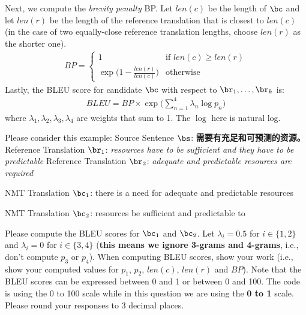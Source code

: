 \begin{parts}
    Next, we compute the \textit{brevity penalty} BP. Let $len(c)$ be the length of $\bc$ and let $len(r)$ be the length of the reference translation that is closest to $len(c)$ (in the case of two equally-close reference translation lengths, choose $len(r)$ as the shorter one). 
    \begin{align}
        BP = 
        \begin{cases}
            1 & \text{if } len(c) \ge len(r) \\
            \exp \big( 1 - \frac{len(r)}{len(c)} \big) & \text{otherwise}
        \end{cases}
    \end{align}
    Lastly, the BLEU score for candidate $\bc$ with respect to $\br_1,\dots,\br_k$ is:
    \begin{align}
        BLEU = BP \times \exp \Big( \sum_{n=1}^4 \lambda_n \log p_n \Big)
    \end{align}
    where $\lambda_1,\lambda_2,\lambda_3,\lambda_4$ are weights that sum to 1. The $\log$ here is natural log.
    \newline
    \begin{subparts}
        \subpart[5] Please consider this example: \newline
        Source Sentence $\bs$: \textbf{需要有充足和可预测的资源。} 
        \newline
        Reference Translation $\br_1$: \textit{resources have to be sufficient and they have to be predictable}
        \newline
        Reference Translation $\br_2$: \textit{adequate and predictable resources are required}
        
        NMT Translation $\bc_1$: there is a need for adequate and predictable resources
        
        NMT Translation $\bc_2$: resources be suﬀicient and predictable to
        
        Please compute the BLEU scores for $\bc_1$ and $\bc_2$. Let $\lambda_i=0.5$ for $i\in\{1,2\}$ and $\lambda_i=0$ for $i\in\{3,4\}$ (\textbf{this means we ignore 3-grams and 4-grams}, i.e., don't compute $p_3$ or $p_4$). When computing BLEU scores, show your work (i.e., show your computed values for $p_1$, $p_2$, $len(c)$, $len(r)$ and $BP$). Note that the BLEU scores can be expressed between 0 and 1 or between 0 and 100. The code is using the 0 to 100 scale while in this question we are using the \textbf{0 to 1} scale. Please round your responses to 3 decimal places. 
        \newline
        

\end{subparts}
\end{parts}
